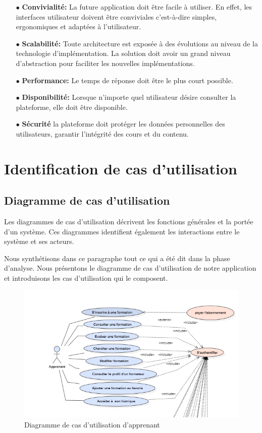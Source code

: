 \begin{itemize}
    \item[$\bullet$] \textbf{Convivialité:} La future application doit être facile à utiliser. En effet, les interfaces utilisateur doivent être conviviales c’est-à-dire simples, ergonomiques et adaptées à l’utilisateur.
    \item[$\bullet$] \textbf{Scalabilité:} Toute architecture est exposée à des évolutions au niveau de la technologie d’implémentation. La solution doit avoir un grand niveau d’abstraction pour faciliter les nouvelles implémentations.
    \item[$\bullet$] \textbf{Performance:} Le temps de réponse doit être le plus court possible.
    \item[$\bullet$] \textbf{Disponibilité:} Lorsque n’importe quel utilisateur désire consulter la plateforme, elle doit être disponible.
    \item[$\bullet$] \textbf{Sécurité} la plateforme doit protéger les données personnelles des utilisateurs, garantir l'intégrité des cours et du contenu.
\end{itemize}

\section{Identification de cas d’utilisation}

\subsection{Diagramme de cas d’utilisation}

Les diagrammes de cas d'utilisation décrivent les fonctions générales et la portée d'un système. Ces diagrammes identifient également les interactions entre le système et ses acteurs.

Nous synthétisons dans ce paragraphe tout ce qui a été dit dans la phase d’analyse. Nous présentons le diagramme de cas d’utilisation de notre application et introduisons les cas d’utilisation qui le composent.

\begin{figure}[H]
    \centering
    \includegraphics[width=15cm]{Figures/apprenant.PNG}
    \caption{Diagramme de cas d’utilisation d'apprenant}
\end{figure}

